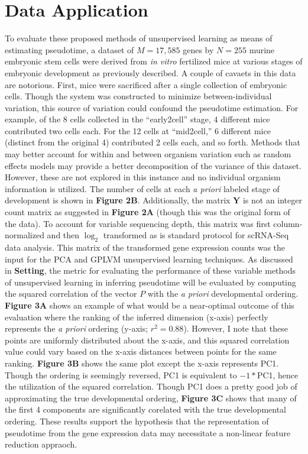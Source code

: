 \documentclass[english, 11pt]{article}\usepackage[]{graphicx}\usepackage[]{color}
\begin{document}
\section{Data Application}
To evaluate these proposed methods of unsupervised learning as means of estimating pseudotime, a dataset of $M = 17,585$ genes by $N = 255$ murine embryonic stem cells were derived from \textit{in vitro} fertilized mice at various stages of embryonic development as previously described.  \cite{deng2014single} A couple of cavaets in this data are notorious. First, mice were sacrificed after a single collection of embryonic cells. Though the system was constructed to minimize between-individual variation, this source of variation could confound the pseudotime estimation. For example, of the 8 cells collected in the ``early2cell'' stage, 4 different mice contributed two cells each. For the 12 cells at ``mid2cell,'' 6 different mice (distinct from the original 4) contributed 2 cells each, and so forth. Methods that may better account for within and between organism variation such as random effects models may provide a better decomposition of the variance of this dataset. However, these are not explored in this instance and no individual organism information is utilized. The number of cells at each \textit{a priori} labeled stage of development is shown in \textbf{Figure 2B}. Additionally, the matrix $\mathbf{Y}$ is not an integer count matrix as suggested in \textbf{Figure 2A} (though this was the original form of the data). To account for variable sequencing depth, this matrix was first column-normalized and then $\log_2$ transformed as is standard protocol for scRNA-Seq data analysis. This matrix of the transformed gene expression counts was the input for the PCA and GPLVM unsupervised learning techniques. \newline \newline
As discussed in \textbf{Setting}, the metric for evaluating the performance of these variable methods of unsupervised learning in inferring pseudotime will be evaluated by computing the squared correlation of the vector $P$ with the \textit{a priori} developmental ordering. \textbf{Figure 3A} shows an example of what would be a near-optimal outcome of this evaluation where the ranking of the inferred dimension (x-axis) perfectly represents the \textit{a priori} ordering (y-axis; $r^2 = 0.88$). However, I note that these points are uniformly distributed about the x-axis, and this squared correlation value could vary based on the x-axis distances between points for the same ranking. \textbf{Figure 3B} shows the same plot except the x-axis represents PC1. Though the ordering is seemingly reversed, PC1 is equivalent to $-1*$PC1, hence the utilization of the squared correlation. Though PC1 does a pretty good job of approximating the true developmental ordering, \textbf{Figure 3C} shows that many of the first 4 components are significantly corelated with the true developmental ordering. These results support the hypothesis that the representation of pseudotime from the gene expression data may necessitate a non-linear feature reduction appraoch. \newline \newline
\end{document}
